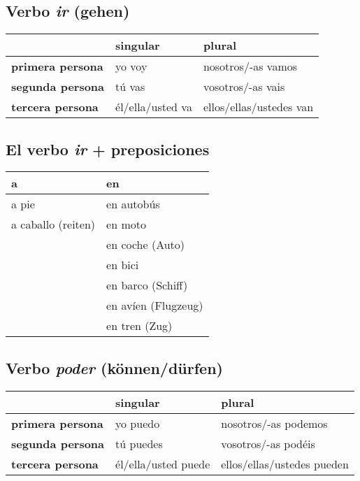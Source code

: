 \documentclass{article}
\begin{document}
	\subsection{Verbo \textit{ir} (gehen)}
	
	\begin{center}
		\begin{tabular}{l|l|l}
			& \textbf{singular} & \textbf{plural} \\
			\hline
			\textbf{primera persona} & yo voy & nosotros/-as vamos \\
			\hline
			\textbf{segunda persona} & tú vas & vosotros/-as vais \\
			\hline
			\textbf{tercera persona} & él/ella/usted va &ellos/ellas/ustedes van
		\end{tabular}
	\end{center}

	\subsection{El verbo \textit{ir} + preposiciones}
	
	\begin{center}
		\begin{tabular}{L{5cm}|L{5cm}}
			\textbf{a} & \textbf{en} \\
			\hline
			a pie & en autobús \\
			a caballo (reiten) & en moto \\
			& en coche (Auto) \\
			& en bici \\
			& en barco (Schiff) \\
			& en avíen (Flugzeug) \\
			& en tren (Zug)
		\end{tabular}
	\end{center}

	\subsection{Verbo \textit{poder} (können/dürfen)}
	
	\begin{center}
		\begin{tabular}{l|l|l}
			& \textbf{singular} & \textbf{plural} \\
			\hline
			\textbf{primera persona} & yo puedo & nosotros/-as podemos \\
			\hline
			\textbf{segunda persona} & tú puedes & vosotros/-as podéis \\
			\hline
			\textbf{tercera persona} & él/ella/usted puede &ellos/ellas/ustedes pueden
		\end{tabular}
	\end{center}
\end{document}

